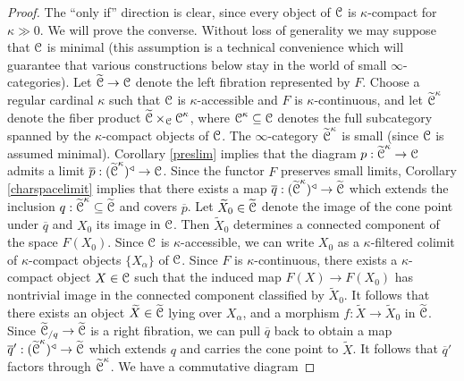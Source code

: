 \begin{proof}
The ``only if'' direction is clear, since every object of $\operatorname{\mathcal{C}}$ is $\kappa$-compact for 
$\kappa \gg 0$. We will prove the converse.
Without loss of generality we may suppose that $\operatorname{\mathcal{C}}$ is minimal (this assumption is a technical convenience which will guarantee that various constructions below stay in the world of small $\infty$-categories).
Let $\widetilde{\operatorname{\mathcal{C}}} \rightarrow \operatorname{\mathcal{C}}$ denote the left fibration represented by $F$. 
Choose a regular cardinal $\kappa$ such that $\operatorname{\mathcal{C}}$ is $\kappa$-accessible and $F$ is
$\kappa$-continuous, and let $\widetilde{\operatorname{\mathcal{C}}}^{\kappa}$ denote the fiber product
$\widetilde{\operatorname{\mathcal{C}}} \times_{\operatorname{\mathcal{C}}} \operatorname{\mathcal{C}}^{\kappa}$, where $\operatorname{\mathcal{C}}^{\kappa} \subseteq \operatorname{\mathcal{C}}$ denotes the full subcategory spanned by the $\kappa$-compact objects of $\operatorname{\mathcal{C}}$. The $\infty$-category
$\widetilde{\operatorname{\mathcal{C}}}^{\kappa}$ is small (since $\operatorname{\mathcal{C}}$ is assumed minimal). Corollary \ref{preslim} implies that the diagram $p: \widetilde{\operatorname{\mathcal{C}}}^{\kappa} \rightarrow \operatorname{\mathcal{C}}$ admits a limit
$\overline{p}: (\widetilde{\operatorname{\mathcal{C}}}^{\kappa})^{\triangleleft} \rightarrow \operatorname{\mathcal{C}}$. Since the functor $F$
preserves small limits, Corollary \ref{charspacelimit} implies that there exists a map
$\overline{q}: (\widetilde{\operatorname{\mathcal{C}}}^{\kappa})^{\triangleleft} \rightarrow \widetilde{\operatorname{\mathcal{C}}}$ which extends
the inclusion $q: \widetilde{\operatorname{\mathcal{C}}}^{\kappa} \subseteq \widetilde{\operatorname{\mathcal{C}}}$ and covers $\overline{p}$.
Let $\widetilde{X}_0 \in \widetilde{\operatorname{\mathcal{C}}}$ denote the image of the cone point under $\overline{q}$ and $X_0$ its image in $\operatorname{\mathcal{C}}$. Then $\widetilde{X}_0$ determines a connected component of the space $F(X_0)$. Since $\operatorname{\mathcal{C}}$ is $\kappa$-accessible, we can write
$X_0$ as a $\kappa$-filtered colimit of $\kappa$-compact objects $\{ X_{\alpha} \}$ of $\operatorname{\mathcal{C}}$. Since $F$ is $\kappa$-continuous, there exists a $\kappa$-compact object $X \in \operatorname{\mathcal{C}}$ such that the induced map $F(X) \rightarrow F(X_0)$ has nontrivial image in the connected component classified by $\widetilde{X}_0$. It follows that there exists an object $\widetilde{X} \in \widetilde{\operatorname{\mathcal{C}}}$ lying
over $X_{\alpha}$, and a morphism $f: \widetilde{X} \rightarrow \widetilde{X}_0$ in
$\widetilde{\operatorname{\mathcal{C}}}$. Since $\widetilde{\operatorname{\mathcal{C}}}_{/q} \rightarrow \widetilde{\operatorname{\mathcal{C}}}$ is a right fibration,
we can pull $\overline{q}$ back to obtain a map
$\overline{q}': (\widetilde{\operatorname{\mathcal{C}}}^{\kappa})^{\triangleleft} \rightarrow \widetilde{\operatorname{\mathcal{C}}}$ 
which extends $q$ and carries the cone point to $\widetilde{X}$. It follows that
$\overline{q}'$ factors through $\widetilde{\operatorname{\mathcal{C}}}^{\kappa}$. We have a commutative diagram

\end{proof}
